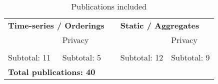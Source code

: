 \begin{table}
    \centering
        \caption{Publications included}\label{tab:citeinc}
    
        \begin{tabular}{@{}lllll@{}} \toprule
        
        \multicolumn{2}{l}{\textbf{Time-series / Orderings}} & {} & \multicolumn{2}{l}{\textbf{Static / Aggregates}}\\ 
        \cmidrule{1-2} \cmidrule{4-5}
        
        {} & Privacy & {} & {} & Privacy \\ \cmidrule{2}\cmidrule{5}
        
        \cite{Xiao2017-lh}\cite{esteban2017real}\cite{yahi2017generative}\cite{Xiao2018-aj}\cite{mcdermott2018semi}\cite{Wang_2019}\cite{Fisher2019}\cite{cui2019conan}\cite{walsh2020generating}\cite{Xu2019-ay}\cite{yu2019rare} & \cite{Che_2017}\cite{Beaulieu-Jones2019-ct}\cite{severo2019ward2icu}\cite{Goncalves2020}\cite{Yale_2020} &
        {}
        & \cite{Yoon2018-dm}\cite{Yoon2018-mo}\cite{Camino2018-re}\cite{Jackson_2019}\cite{Yang_2019}\cite{Li_2020}\cite{Che_2017}\cite{chu2019treatment}\cite{chen2019ganleaks}\cite{Baowaly_2019}\cite{Baowaly2019}\cite{ozyigit2020generation} & \cite{Choi2017-nt}\cite{Zhang2020-wp}\cite{Bae2020}\cite{Yoon2020}\cite{Yale_2020}\cite{yale:hal-02160496}\cite{p2019}\cite{torfi2019generating}\cite{chin2019generation}\\ 
        \cmidrule{1-2} \cmidrule{4-5}
        
        \multicolumn{1}{l}{Subtotal: 11} & \multicolumn{1}{l}{Subtotal: 5} & {} & \multicolumn{1}{l}{Subtotal: 12} & \multicolumn{1}{l}{Subtotal: 9}\\ \midrule
        
        \multicolumn{5}{l}{\textbf{Total publications: 40}}\\
        \bottomrule
        \end{tabular}
\end{table}